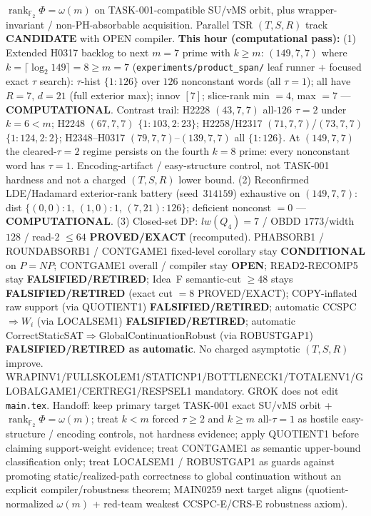 \documentclass[11pt]{article}
\begin{document}
$\operatorname{rank}_{\mathbb F_2}\Phi=\omega(m)$ on TASK-001-compatible SU/vMS orbit,
plus wrapper-invariant / non-PH-absorbable acquisition.
Parallel TSR $(T,S,R)$ track \textbf{CANDIDATE} with OPEN compiler.
\textbf{This hour (computational pass):}
(1) Extended H0317 backlog to next $m{=}7$ prime with $k{\ge}m$:
$(149,7,7)$ where $k=\lceil\log_2 149\rceil=8{\ge}m{=}7$
(\texttt{experiments/product\_span/} leaf runner + focused exact $\tau$ search):
$\tau$-hist $\{1{:}126\}$ over $126$ nonconstant words (all $\tau{=}1$);
all have $R{=}7$, $d{=}21$ (full exterior max); innov $[7]$;
slice-rank min $=4$, max $=7$ --- \textbf{COMPUTATIONAL}.
Contrast trail: H2228 $(43,7,7)$ all-$126$ $\tau{=}2$ under $k{=}6{<}m$;
H2248 $(67,7,7)$ $\{1{:}103,2{:}23\}$; H2258/H2317 $(71,7,7)$/$(73,7,7)$ $\{1{:}124,2{:}2\}$;
H2348--H0317 $(79,7,7)$--$(139,7,7)$ all $\{1{:}126\}$.
At $(149,7,7)$ the cleared-$\tau{=}2$ regime persists on the fourth $k{=}8$ prime:
every nonconstant word has $\tau{=}1$. Encoding-artifact / easy-structure control,
not TASK-001 hardness and not a charged $(T,S,R)$ lower bound.
(2) Reconfirmed LDE/Hadamard exterior-rank battery (seed~$314159$) exhaustive on
$(149,7,7)$: dist $\{(0,0){:}1,\,(1,0){:}1,\,(7,21){:}126\}$; deficient nonconst $=0$ ---
\textbf{COMPUTATIONAL}.
(3) Closed-set DP: $lw(Q_4)=7$ / OBDD $1773$/width $128$ / read-$2$ $\le64$
\textbf{PROVED/EXACT} (recomputed).
PHABSORB1 / ROUNDABSORB1 / CONTGAME1 fixed-level corollary stay \textbf{CONDITIONAL} on $P=NP$;
CONTGAME1 overall / compiler stay \textbf{OPEN}; READ2-RECOMP5 stay \textbf{FALSIFIED/RETIRED};
Idea~F semantic-cut $\ge48$ stays \textbf{FALSIFIED/RETIRED} (exact cut $=8$ PROVED/EXACT);
COPY-inflated raw support (via QUOTIENT1) \textbf{FALSIFIED/RETIRED};
automatic CCSPC$\Rightarrow W_i$ (via LOCALSEM1) \textbf{FALSIFIED/RETIRED};
automatic CorrectStaticSAT$\Rightarrow$GlobalContinuationRobust (via ROBUSTGAP1)
\textbf{FALSIFIED/RETIRED as automatic}.
No charged asymptotic $(T,S,R)$ improve.
WRAPINV1/FULLSKOLEM1/STATICNP1/BOTTLENECK1/TOTALENV1/GLOBALGAME1/CERTREG1/RESPSEL1 mandatory.
GROK does not edit \texttt{main.tex}.
Handoff: keep primary target TASK-001 exact SU/vMS orbit + $\operatorname{rank}_{\mathbb F_2}\Phi=\omega(m)$;
treat $k{<}m$ forced $\tau{\ge}2$ and $k{\ge}m$ all-$\tau{=}1$ as hostile easy-structure /
encoding controls, not hardness evidence; apply QUOTIENT1 before claiming support-weight
evidence; treat CONTGAME1 as semantic upper-bound classification only; treat LOCALSEM1 /
ROBUSTGAP1 as guards against promoting static/realized-path correctness to global
continuation without an explicit compiler/robustness theorem; MAIN0259 next target
aligns (quotient-normalized $\omega(m)$ + red-team weakest CCSPC-E/CRS-E robustness axiom).
\end{document}
